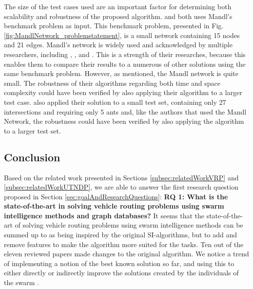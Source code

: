 The size of the test cases used are an important factor for determining both scalability and robustness of the proposed algorithm. \citet{nikolic14} and \citet{kechagiopoulos14} both uses Mandl's benchmark problem as input. This benchmark problem, presented in Fig. \vref{fig:MandlNetwork_problemstatement},  is a small network containing 15 nodes and 21 edges.  Mandl's network is widely used and acknowledged by multiple researchers, including \citet{baaj91}, \citet{chakroborty02}, and \citet{fan09}. This is a strength of their researches, because this enables them to compare their results to a numerous of other solutions using the same benchmark problem. However, as mentioned, the Mandl network is quite small. The robustness of their algorithms regarding both time and space complexity could have been verified by also applying their algorithm to a larger test case. \citet{salehi-nezhad07} also applied their solution to a small test set, containing only 27 intersections and requiring only 5 ants and, like the authors that used the Mandl Network, the robustness could have been verified by also applying the algorithm to a larger test set.  \newline

\subsection{Conclusion}
\label{subsec:relatedWorkConclusion}

Based on the related work presented in Sections \vref{subsec:relatedWorkVRP} and \vref{subsec:relatedWorkUTNDP}, we are able to answer the first research question proposed in Section \vref{sec:goalAndResearchQuestions}:
\newline
\newline
\textbf{RQ 1: What is the state-of-the-art in solving vehicle routing problems using swarm intelligence methods and graph databases?}
\newline
\newline
It seems that the state-of-the-art of solving vehicle routing problems using swarm intelligence methods can be summed up to as being inspired by the original SI-algorithms, but to add and remove features to make the algorithm more suited for the tasks. Ten out of the eleven reviewed papers made changes to the original algorithm. We notice a trend of implementing a notion of the best known solution so far, and using this to either directly or indirectly improve the solutions created by the individuals of the swarm \citep{tripathi09,sedighpour14,nikolic14}. 

